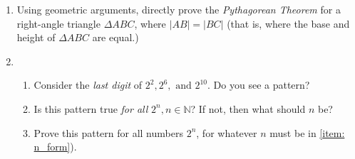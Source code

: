 \documentclass[../proofs.tex]{subfiles}
\begin{document}
\begin{enumerate}
			\item \challenge Using geometric arguments, directly prove the \emph{Pythagorean Theorem} for a right-angle triangle $\Delta ABC$, where $|AB|=|BC|$ (that is, where the base and height of $\Delta ABC$ are equal.)
		\item \challenge
			\begin{enumerate}
				\item Consider the \emph{last digit} of $2^2, 2^6, \text{ and } 2^{10}$. Do you see a pattern?
				\item Is this pattern true \emph{for all} $2^n, n\in\mathbb{N}$? If not, then what should $n$ be? \label{item: n_form}
				\item Prove this pattern for all numbers $2^n$, for whatever $n$ must be in \ref{item: n_form}).
			\end{enumerate}

		\end{enumerate}
\end{document}
